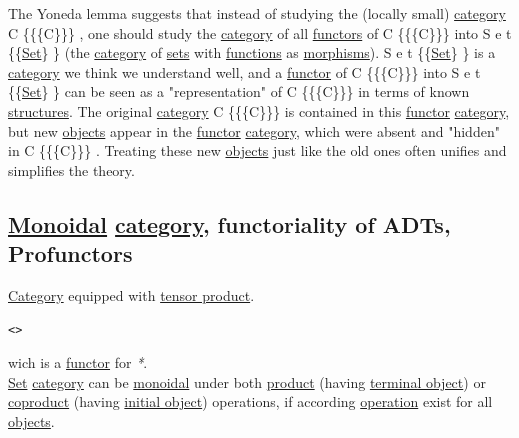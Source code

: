 \documentclass[11pt]{article}
\begin{document}
The Yoneda lemma suggests that instead of studying the (locally small) \hyperref[org0450535]{category} C \{\displaystyle \{\mathcal \{C\}\}\}  , one should study the \hyperref[org0450535]{category} of all \hyperref[orgdd21ed6]{functors} of C \{\displaystyle \{\mathcal \{C\}\}\}  into S e t \{\displaystyle \mathbf \{\hyperref[org1faf06d]{Set}\} \}  (the \hyperref[org0450535]{category} of \hyperref[org58ec608]{sets} with \hyperref[orgaa8fb87]{functions} as \hyperref[org6c2fa5c]{morphisms}). S e t \{\displaystyle \mathbf \{\hyperref[org1faf06d]{Set}\} \}  is a \hyperref[org0450535]{category} we think we understand well, and a \hyperref[orgf2f6841]{functor} of C \{\displaystyle \{\mathcal \{C\}\}\}  into S e t \{\displaystyle \mathbf \{\hyperref[org1faf06d]{Set}\} \}  can be seen as a "representation" of C \{\displaystyle \{\mathcal \{C\}\}\}  in terms of known \hyperref[orgc87c48c]{structures}. The original \hyperref[org0450535]{category} C \{\displaystyle \{\mathcal \{C\}\}\}  is contained in this \hyperref[orgf2f6841]{functor} \hyperref[org0450535]{category}, but new \hyperref[org363acc2]{objects} appear in the \hyperref[orgf2f6841]{functor} \hyperref[org0450535]{category}, which were absent and "hidden" in C \{\displaystyle \{\mathcal \{C\}\}\}  . Treating these new \hyperref[org363acc2]{objects} just like the old ones often unifies and simplifies the theory.\\

\subsection{\hyperref[orgac4647e]{Monoidal} \hyperref[org0450535]{category}, functoriality of ADTs, Profunctors}
\label{sec:org4a3f25c}

\hyperref[org0450535]{Category} equipped with \hyperref[org80f58ae]{tensor product}.\\
\begin{verbatim}
<>
\end{verbatim}
wich is a \hyperref[orgf2f6841]{functor} for \emph{*}.\\

\hyperref[org1faf06d]{Set} \hyperref[org0450535]{category} can be \hyperref[orgac4647e]{monoidal} under both \hyperref[org80a0b6e]{product} (having \hyperref[org84bb7e1]{terminal object}) or \hyperref[org4de405e]{coproduct} (having \hyperref[org775e1a6]{initial object}) operations, if according \hyperref[org1173fe8]{operation} exist for all \hyperref[org363acc2]{objects}.\\
\end{document}
